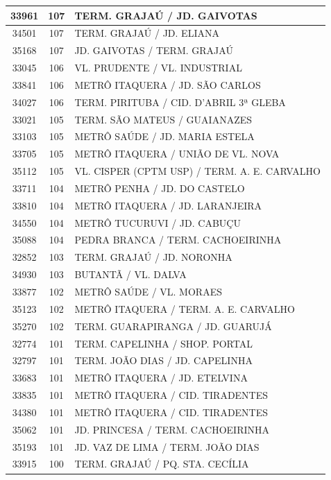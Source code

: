 \documentclass[
	12pt,				%
	oneside,			%
	a4paper,			%
	english,			%
	brazil				%
	]{abntex2ppgsi}
\begin{document}
{{{\begin{apendicesenv}
\begin{longtable}{c|c|p{7cm}}
 \hline 
33961 &	107 &	TERM. GRAJAÚ / JD. GAIVOTAS \\ 
 \hline 
34501 &	107 &	TERM. GRAJAÚ / JD. ELIANA \\ 
 \hline 
35168 &	107 &	JD. GAIVOTAS / TERM. GRAJAÚ \\ 
 \hline 
33045 &	106 &	VL. PRUDENTE / VL. INDUSTRIAL \\ 
 \hline 
33841 &	106 &	METRÔ ITAQUERA / JD. SÃO CARLOS \\ 
 \hline 
34027 &	106 &	TERM. PIRITUBA / CID. D'ABRIL 3ª GLEBA \\ 
 \hline 
33021 &	105 &	TERM. SÃO MATEUS / GUAIANAZES \\ 
 \hline 
33103 &	105 &	METRÔ SAÚDE / JD. MARIA ESTELA \\ 
 \hline 
33705 &	105 &	METRÔ ITAQUERA / UNIÃO DE VL. NOVA \\ 
 \hline 
35112 &	105 &	VL. CISPER (CPTM USP) / TERM. A. E. CARVALHO \\ 
 \hline 
33711 &	104 &	METRÔ PENHA / JD. DO CASTELO \\ 
 \hline 
33810 &	104 &	METRÔ ITAQUERA / JD. LARANJEIRA \\ 
 \hline 
34550 &	104 &	METRÔ TUCURUVI / JD. CABUÇU \\ 
 \hline 
35088 &	104 &	PEDRA BRANCA / TERM. CACHOEIRINHA \\ 
 \hline 
32852 &	103 &	TERM. GRAJAÚ / JD. NORONHA \\ 
 \hline 
34930 &	103 &	BUTANTÃ / VL. DALVA \\ 
 \hline 
33877 &	102 &	METRÔ SAÚDE / VL. MORAES \\ 
 \hline 
35123 &	102 &	METRÔ ITAQUERA / TERM. A. E. CARVALHO \\ 
 \hline 
35270 &	102 &	TERM. GUARAPIRANGA / JD. GUARUJÁ \\ 
 \hline 
32774 &	101 &	TERM. CAPELINHA / SHOP. PORTAL \\ 
 \hline 
32797 &	101 &	TERM. JOÃO DIAS / JD. CAPELINHA \\ 
 \hline 
33683 &	101 &	METRÔ ITAQUERA / JD. ETELVINA \\ 
 \hline 
33835 &	101 &	METRÔ ITAQUERA / CID. TIRADENTES \\ 
 \hline 
34380 &	101 &	METRÔ ITAQUERA / CID. TIRADENTES \\ 
 \hline 
35062 &	101 &	JD. PRINCESA / TERM. CACHOEIRINHA \\ 
 \hline 
35193 &	101 &	JD. VAZ DE LIMA / TERM. JOÃO DIAS \\ 
 \hline 
33915 &	100 &	TERM. GRAJAÚ / PQ. STA. CECÍLIA \\ 

\end{longtable}
\end{apendicesenv}}}}
\end{document}
